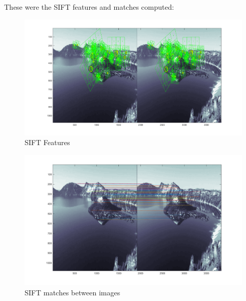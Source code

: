 \documentclass[11pt,psfig]{article}
\begin{document}
These were the SIFT features and matches computed:
\begin{figure}[H]
\centering
\includegraphics[width=\columnwidth]{sfmResults1/siftMatchesVLFeat1.png}
\caption{SIFT Features}
\end{figure}
\begin{figure}[H]
\centering
\includegraphics[width=\columnwidth]{sfmResults1/siftMatchesVLFeat2.png}
\caption{SIFT matches between images}
\end{figure}

\newpage
\end{document}
